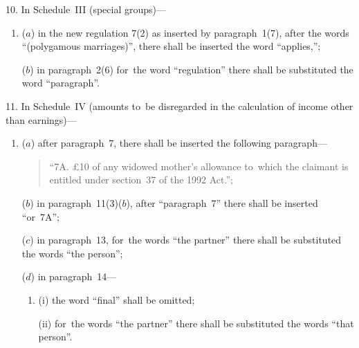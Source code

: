 \documentclass[12pt,a4paper]{article}
\begin{document}
\medskip

10.  In Schedule~III (special groups)—
\begin{enumerate}\item[]
($a$) in the new regulation 7(2) as inserted by paragraph~1(7), after the words “(polygamous marriages)”, there shall be inserted the word “applies,”;

($b$) in paragraph~2(6) for~the word “regulation” there shall be substituted the word “paragraph”.
\end{enumerate}

\medskip

11.  In Schedule~IV (amounts to~be disregarded in the calculation of income other than earnings)—
\begin{enumerate}\item[]
($a$) after paragraph~7, there shall be inserted the following paragraph—
\begin{quotation}
“7A.  £10 of any widowed mother’s allowance to~which the claimant is entitled under section~37 of the 1992 Act.”;
\end{quotation}

($b$) in paragraph~11(3)($b$), after “paragraph~7” there shall be inserted “or~7A”;

($c$) in paragraph~13, for~the words “the partner” there shall be substituted the words “the person”;

($d$) in paragraph~14—
\begin{enumerate}\item[]
(i) the word “final” shall be omitted;

(ii) for~the words “the partner” there shall be substituted the words “that person”.
\end{enumerate}
\end{enumerate}

\medskip
\end{document}
